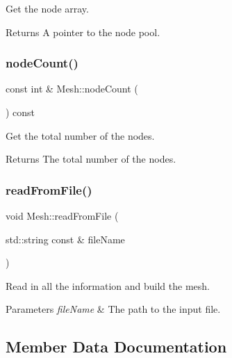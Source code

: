 Get the node array. 

\begin{DoxyReturn}{Returns}
A pointer to the node pool. 
\end{DoxyReturn}
\mbox{\label{class_mesh_a6a535f67f00ed39f945aaa1e8039a277}} 
\subsubsection{\texorpdfstring{node\+Count()}{nodeCount()}}
{\footnotesize\ttfamily const int \& Mesh\+::node\+Count (\begin{DoxyParamCaption}{ }\end{DoxyParamCaption}) const}



Get the total number of the nodes. 

\begin{DoxyReturn}{Returns}
The total number of the nodes. 
\end{DoxyReturn}
\mbox{\label{class_mesh_a519813e103dbb3fb1739a2c40b3e1153}} 
\subsubsection{\texorpdfstring{read\+From\+File()}{readFromFile()}}
{\footnotesize\ttfamily void Mesh\+::read\+From\+File (\begin{DoxyParamCaption}\item[{std\+::string const \&}]{file\+Name }\end{DoxyParamCaption})}



Read in all the information and build the mesh. 


\begin{DoxyParams}{Parameters}
{\em file\+Name} & The path to the input file. \\
\hline
\end{DoxyParams}


\subsection{Member Data Documentation}
\mbox{\label{class_mesh_a5a1c5739ef85c8f9071f689e790b5251}} 
